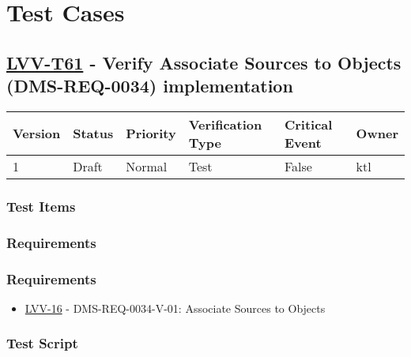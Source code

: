 \hypertarget{test-cases}{%
\section{Test Cases}\label{test-cases}}

\hypertarget{lvv-t61---verify-associate-sources-to-objects-dms-req-0034-implementation}{%
\subsection{\texorpdfstring{\href{https://jira.lsstcorp.org/secure/Tests.jspa\#/testCase/LVV-T61}{LVV-T61}
- Verify Associate Sources to Objects (DMS-REQ-0034)
implementation}{LVV-T61 - Verify Associate Sources to Objects (DMS-REQ-0034) implementation}}\label{lvv-t61---verify-associate-sources-to-objects-dms-req-0034-implementation}}

\begin{longtable}[]{@{}llllll@{}}
\toprule
Version & Status & Priority & Verification Type & Critical Event &
Owner\tabularnewline
\midrule
\endhead
1 & Draft & Normal & Test & False & ktl\tabularnewline
\bottomrule
\end{longtable}

\hypertarget{test-items}{%
\subsubsection{Test Items}\label{test-items}}

\hypertarget{requirements}{%
\subsubsection{Requirements}\label{requirements}}

\hypertarget{requirements-1}{%
\subsubsection{Requirements}\label{requirements-1}}

\begin{itemize}
\tightlist
\item
  \href{https://jira.lsstcorp.org/browse/LVV-16}{LVV-16} -
  DMS-REQ-0034-V-01: Associate Sources to Objects
\end{itemize}

\hypertarget{test-script}{%
\subsubsection{Test Script}\label{test-script}}

